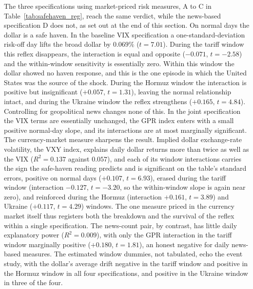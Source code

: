 The three specifications using market-priced risk measures, A to C in Table~\ref{tab:safehaven_reg}, reach the same verdict, while the news-based specification D does not, as set out at the end of this section. On normal days the
dollar is a safe haven. In the baseline VIX specification a one-standard-deviation risk-off
day lifts the broad dollar by $0.069\%$ ($t=7.01$). During the tariff window this reflex
disappears, the interaction is equal and opposite ($-0.071$, $t=-2.58$) and the within-window sensitivity is essentially zero. Within this window the dollar showed no haven response, and this is the one episode in which the United States was the source of the shock. During
the Hormuz window the interaction is positive but insignificant ($+0.057$, $t=1.31$),
leaving the normal relationship intact, and during the Ukraine window the reflex
strengthens ($+0.165$, $t=4.84$). Controlling for geopolitical news changes none of this.
In the joint specification the VIX terms are essentially unchanged, the GPR index enters
with a small positive normal-day slope, and its interactions are at most marginally
significant. The currency-market measure sharpens the result. Implied dollar exchange-rate
volatility, the VXY index, explains daily dollar returns more than twice as well as the
VIX ($R^2=0.137$ against $0.057$), and each of its window interactions carries the sign the safe-haven reading predicts and is significant on the table's standard errors, positive on normal days ($+0.107$, $t=6.93$), erased during the tariff window (interaction $-0.127$, $t=-3.20$, so the within-window slope is again near zero), and reinforced during the Hormuz (interaction $+0.161$, $t=3.89$) and Ukraine ($+0.117$, $t=4.29$) windows.
The one measure priced in the currency market itself thus registers both the breakdown and
the survival of the reflex within a single specification. The news-count pair, by
contrast, has little daily explanatory power ($R^2=0.009$), with only the GPR interaction
in the tariff window marginally positive ($+0.180$, $t=1.81$), an honest negative for daily
news-based measures. The estimated window dummies, not tabulated, echo the event study,
with the dollar's average drift negative in the tariff window and positive in the Hormuz window in all four specifications, and positive in the Ukraine window in three of the four.

